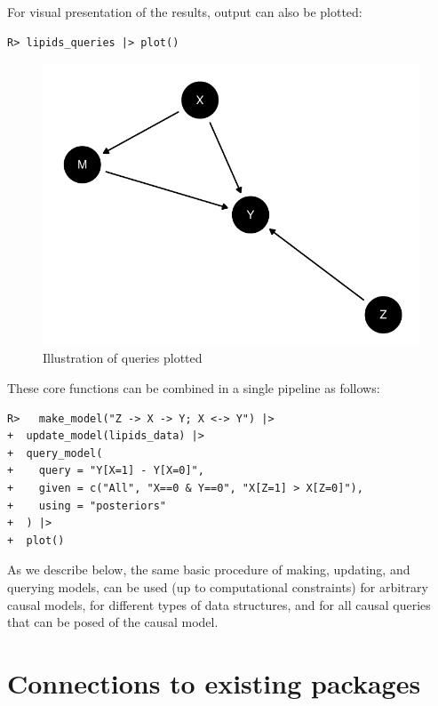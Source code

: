 \documentclass[
  11pt,
  article]{jss}
\begin{document}
For visual presentation of the results, output can also be plotted:

\begin{verbatim}
R> lipids_queries |> plot()
\end{verbatim}

\begin{figure}[H]

{\centering \includegraphics{paper_files/figure-pdf/unnamed-chunk-7-1.pdf}

}

\caption{Illustration of queries plotted}

\end{figure}%

These core functions can be combined in a single pipeline as follows:

\begin{verbatim}
R>   make_model("Z -> X -> Y; X <-> Y") |>
+  update_model(lipids_data) |>
+  query_model(
+    query = "Y[X=1] - Y[X=0]",
+    given = c("All", "X==0 & Y==0", "X[Z=1] > X[Z=0]"),
+    using = "posteriors"
+  ) |>
+  plot()
\end{verbatim}

As we describe below, the same basic procedure of making, updating, and
querying models, can be used (up to computational constraints) for
arbitrary causal models, for different types of data structures, and for
all causal queries that can be posed of the causal model.

\section{Connections to existing
packages}\label{connections-to-existing-packages}
\end{document}
